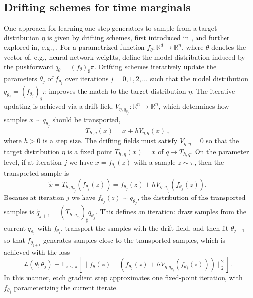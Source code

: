 \documentclass[oneside,11pt]{article}
\theoremstyle{remark}
\newcommand{\R}{\mathbb{R}}
\begin{document}
\subsection{Drifting schemes for time marginals}
One approach 
    for learning one-step generators to sample from a target distribution $\eta$ is given by drifting schemes, first introduced in \cite{deng2026drifting}, and further explored in, e.g.,  \cite{han2026wflow,turan2026generativedriftingsecretlyscore,lai2026unifiedviewdriftingscorebased}.
For a parametrized function $f_{\theta}: \R^d  \to \R^n$, where $\theta$ denotes the vector of, e.g., neural-network weights, define the model distribution induced by the pushforward $q_{\theta}=(f_{\theta})_{\sharp}\pi$. 
Drifting schemes iteratively update the parameters $\theta_j$ of $f_{\theta_j}$ over iterations $j = 0, 1, 2, \dots$ such that the model distribution $q_{\theta_j} = (f_{\theta_j})_{\sharp}\pi$ improves the match to the target distribution $\eta$.
The iterative updating is achieved via a drift field $V_{\eta,q_{\theta_j}}: \mathbb{R}^n \to \mathbb{R}^n$, which determines how samples $x \sim q_{\theta_j}$ should be transported, 
    \[
    T_{h,q}(x) = 
    x + h V_{\eta, q}(x)\,,
    \]
    where $h > 0$ is a step size. 
The drifting fields must satisfy $V_{\eta, \eta} = 0$ so that the target distribution $\eta$ is a fixed  point $T_{h,\eta}(x) = x$ of $q \mapsto T_{h,q}$. 
On the parameter level, if at iteration $j$ we have $x = f_{\theta_j}(z)$ with a sample $z \sim \pi$, then the transported sample is 
    \[
    \tilde{x} = T_{h,q_{\theta_j}}(f_{\theta_j}(z)) = f_{\theta_j}(z)  + hV_{\eta, q_{\theta_j}}(f_{\theta_j}(z)).
    \]
Because at iteration $j$ we have $f_{\theta_j}(z) \sim q_{\theta_j}$, the distribution of the transported samples is $\tilde{q}_{j + 1} = (T_{h,q_{\theta_j}})_{\sharp}q_{\theta_j}$.
This defines an iteration: draw samples from the current $q_{\theta_j}$ with $f_{\theta_j}$, transport the samples with the drift field, and then fit $\theta_{j + 1}$ so that $f_{\theta_{j + 1}}$ generates samples close to the transported samples, which is achieved with the loss
    \begin{equation}\label{eq:vanilladriftloss}
        \mathcal{L}(\theta; \theta_j) = \mathbb{E}_{z \sim \pi} \left[\|f_{\theta}(z) - \left(f_{\theta_j}(z)+hV_{\eta,q_{\theta_j}}(f_{\theta_j}(z))\right)\|_2^2 \right].
    \end{equation}
In this manner, each gradient step approximates one fixed-point iteration, with $f_{\theta_j}$ parameterizing the current iterate.
\end{document}
